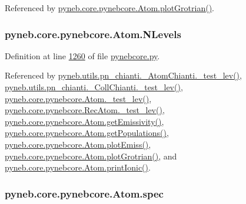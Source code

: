 Referenced by \hyperlink{pynebcore_8py_source_l02372}{pyneb.\+core.\+pynebcore.\+Atom.\+plot\+Grotrian()}.

\hypertarget{classpyneb_1_1core_1_1pynebcore_1_1_atom_a6b43c1e6431a6786c1b4267f704fb4e8}{}
\subsubsection[{N\+Levels}]{\setlength{\rightskip}{0pt plus 5cm}pyneb.\+core.\+pynebcore.\+Atom.\+N\+Levels}\label{classpyneb_1_1core_1_1pynebcore_1_1_atom_a6b43c1e6431a6786c1b4267f704fb4e8}


Definition at line \hyperlink{pynebcore_8py_source_l01260}{1260} of file \hyperlink{pynebcore_8py_source}{pynebcore.\+py}.



Referenced by \hyperlink{pn__chianti_8py_source_l00284}{pyneb.\+utils.\+pn\+\_\+chianti.\+\_\+\+Atom\+Chianti.\+\_\+test\+\_\+lev()}, \hyperlink{pn__chianti_8py_source_l00449}{pyneb.\+utils.\+pn\+\_\+chianti.\+\_\+\+Coll\+Chianti.\+\_\+test\+\_\+lev()}, \hyperlink{pynebcore_8py_source_l01459}{pyneb.\+core.\+pynebcore.\+Atom.\+\_\+test\+\_\+lev()}, \hyperlink{pynebcore_8py_source_l02596}{pyneb.\+core.\+pynebcore.\+Rec\+Atom.\+\_\+test\+\_\+lev()}, \hyperlink{pynebcore_8py_source_l01716}{pyneb.\+core.\+pynebcore.\+Atom.\+get\+Emissivity()}, \hyperlink{pynebcore_8py_source_l01496}{pyneb.\+core.\+pynebcore.\+Atom.\+get\+Populations()}, \hyperlink{pynebcore_8py_source_l02313}{pyneb.\+core.\+pynebcore.\+Atom.\+plot\+Emiss()}, \hyperlink{pynebcore_8py_source_l02372}{pyneb.\+core.\+pynebcore.\+Atom.\+plot\+Grotrian()}, and \hyperlink{pynebcore_8py_source_l02167}{pyneb.\+core.\+pynebcore.\+Atom.\+print\+Ionic()}.

\hypertarget{classpyneb_1_1core_1_1pynebcore_1_1_atom_a02c0f7146a2f5b8eac765a453c763797}{}
\subsubsection[{spec}]{\setlength{\rightskip}{0pt plus 5cm}pyneb.\+core.\+pynebcore.\+Atom.\+spec}\label{classpyneb_1_1core_1_1pynebcore_1_1_atom_a02c0f7146a2f5b8eac765a453c763797}


